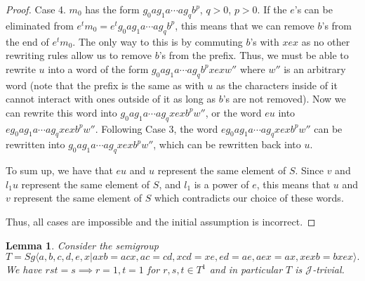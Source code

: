 \documentclass{article}
\newtheorem{lemma}{Lemma}
\theoremstyle{definition}
\def\J{\mathcal J}
\begin{document}
\begin{proof}
Case 4. $m_0$ has the form $g_0 a g_1 a \cdots a g_q b^p$, $q>0$, $p>0$. If the $e$'s can be eliminated from $e^t m_0 = e^t g_0 a g_1 a \cdots a g_q b^p$, this means that we can remove $b$'s from the end of $e^t m_0$. The only way to this is by commuting $b$'s with $xex$ as no other rewriting rules allow us to remove $b$'s from the prefix. Thus, we must be able to rewrite $u$ into a word of the form  $g_0 a g_1 a \cdots a g_q b^p xex w''$ where $w''$ is an arbitrary word (note that the prefix is the same as with $u$ as the characters inside of it cannot interact with ones outside of it as long as $b$'s are not removed). Now we can rewrite this word into  $g_0 a g_1 a \cdots a g_q xex b^p  w''$, or the word $e u$ into $e g_0 a g_1 a \cdots a g_q xex b^p  w''$. Following Case 3, the word  $e g_0 a g_1 a \cdots a g_q xex b^p  w''$ can be rewritten into $g_0 a g_1 a \cdots a g_q xex b^p  w''$, which can be rewritten back into $u$.

To sum up, we have that $e u$ and $u$ represent the same element of $S$. Since $v$  and $l_1 u$ represent the same element of $S$, and $l_1$ is a power of $e$, this means that $u$ and $v$ represent the same element of $S$ which contradicts our choice of these words.

Thus, all cases are impossible and the initial assumption is incorrect.
\end{proof}

\begin{lemma}\label{lem_strongj}
Consider the semigroup $$T = Sg \langle a,b,c,d,e,x | axb = acx, ac = cd, xcd = xe, ed = ae, aex = ax, xexb = bxex \rangle.$$ We have $rst = s \implies r=1, t=1$ for $r,s,t \in T^1$ and in particular $T$ is $\J$-trivial.
\end{lemma} 
\end{document}
